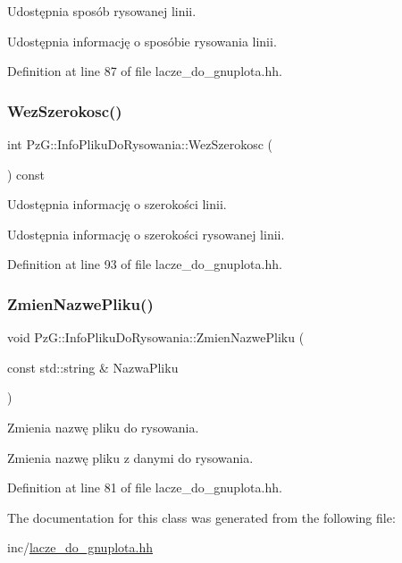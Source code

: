 Udostępnia sposób rysowanej linii. 

Udostępnia informację o sposóbie rysowania linii. 

Definition at line 87 of file lacze\+\_\+do\+\_\+gnuplota.\+hh.

\mbox{\label{class_pz_g_1_1_info_pliku_do_rysowania_a627bb615c50f3b03374774e6b974488b}} 
\subsubsection{\texorpdfstring{Wez\+Szerokosc()}{WezSzerokosc()}}
{\footnotesize\ttfamily int Pz\+G\+::\+Info\+Pliku\+Do\+Rysowania\+::\+Wez\+Szerokosc (\begin{DoxyParamCaption}{ }\end{DoxyParamCaption}) const\hspace{0.3cm}{\ttfamily [inline]}}



Udostępnia informację o szerokości linii. 

Udostępnia informację o szerokości rysowanej linii. 

Definition at line 93 of file lacze\+\_\+do\+\_\+gnuplota.\+hh.

\mbox{\label{class_pz_g_1_1_info_pliku_do_rysowania_ae734c69f5cecf9c0584e3a7f433340ea}} 
\subsubsection{\texorpdfstring{Zmien\+Nazwe\+Pliku()}{ZmienNazwePliku()}}
{\footnotesize\ttfamily void Pz\+G\+::\+Info\+Pliku\+Do\+Rysowania\+::\+Zmien\+Nazwe\+Pliku (\begin{DoxyParamCaption}\item[{const std\+::string \&}]{Nazwa\+Pliku }\end{DoxyParamCaption})\hspace{0.3cm}{\ttfamily [inline]}}



Zmienia nazwę pliku do rysowania. 

Zmienia nazwę pliku z danymi do rysowania. 

Definition at line 81 of file lacze\+\_\+do\+\_\+gnuplota.\+hh.



The documentation for this class was generated from the following file\+:\begin{DoxyCompactItemize}
\item 
inc/\hyperlink{lacze__do__gnuplota_8hh}{lacze\+\_\+do\+\_\+gnuplota.\+hh}\end{DoxyCompactItemize}
